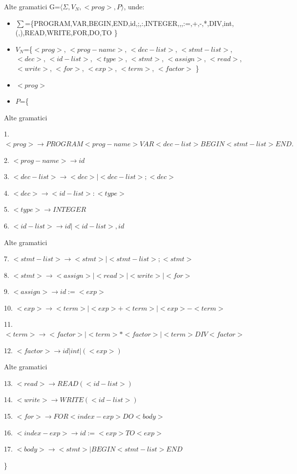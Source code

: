\documentclass[pdf]{beamer}
\begin{document}
\begin{frame}{Alte gramatici}
G=$\langle \Sigma, V_N, <prog>, P \rangle$, unde:

\begin{itemize}
\item
$\sum$=\{PROGRAM,VAR,BEGIN,END,id,;,:,INTEGER,,,:=,+,-,*,DIV,int,(,),READ,WRITE,FOR,DO,TO \}
\item
$V_N$=\{$<prog>$, $<prog-name>$, $<dec-list>$, $<stmt-list>$, $<dec>$, $<id-list>$, $<type>$, $<stmt>$, $<assign>$, $<read>$, $<write>$, $<for>$, $<exp>$, $<term>$, $<factor>$ \}
\item
$<prog>$
\item
$P$=\{

\end{itemize}

\end{frame}



\begin{frame}{Alte gramatici}

1. $<prog> \rightarrow PROGRAM <prog-name> VAR <dec-list> BEGIN <stmt-list> END. $

2. $<prog-name> \rightarrow id$ 

3. $<dec-list> \rightarrow <dec> | <dec-list> ; <dec> $

4. $<dec> \rightarrow <id-list> : <type> $

5. $<type> \rightarrow INTEGER $

6. $<id-list> \rightarrow id | <id-list> , id $

\end{frame}



\begin{frame}{Alte gramatici}

7. $<stmt-list> \rightarrow <stmt> | <stmt-list> ; <stmt> $

8. $<stmt> \rightarrow <assign> | <read> | <write> | <for> $

9. $<assign> \rightarrow id := <exp> $

10. $<exp> \rightarrow <term> | <exp> + <term> | <exp> - <term> $

11. $<term> \rightarrow <factor> | <term> * <factor> | <term> DIV <factor> $

12. $<factor> \rightarrow id | int | ( <exp> ) $

\end{frame}



\begin{frame}{Alte gramatici}

13. $<read> \rightarrow READ ( <id-list> ) $

14. $<write> \rightarrow WRITE ( <id-list> ) $

15. $<for> \rightarrow FOR <index-exp> DO <body> $

16. $<index-exp> \rightarrow id := <exp> TO <exp> $

17. $<body> \rightarrow <stmt> | BEGIN <stmt-list> END $

\}
\end{frame}
\end{document}
